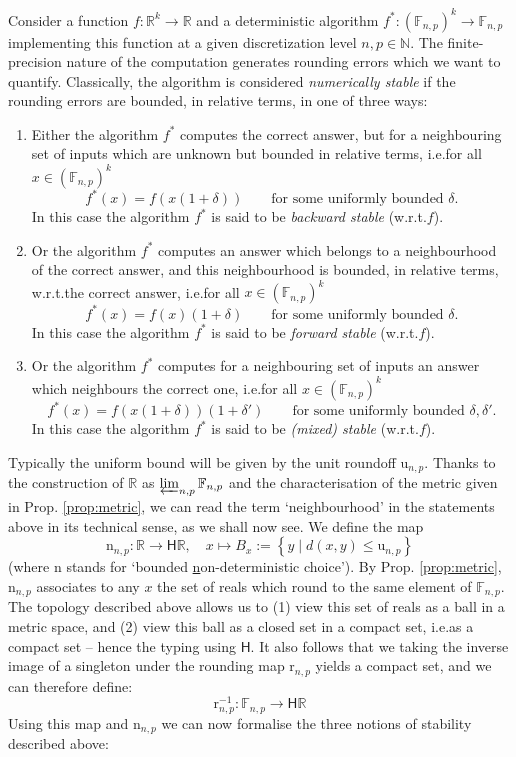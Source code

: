\documentclass[10pt,a4paper]{article}
\theoremstyle{plain}
\theoremstyle{definition}
\newcommand{\F}[1][n,p]{\mathbb{F}_{#1}}
\newcommand{\N}{\mathbb{N}}
\newcommand{\R}{\mathbb{R}}
\newcommand{\Round}[1][n,p]{\mathrm{r}_{#1}}
\newcommand{\Haus}{\mathsf{H}}
\newcommand{\uro}[1][n,p]{\mathrm{u}_{#1}}
\newcommand{\inv}{^{-1}}
\newcommand{\nd}[1][n,p]{\mathrm{n}_{#1}}
\begin{document}
Consider a function $f:\R^k\to\R$ and a deterministic algorithm $f^\ast:(\F)^k\to\F$ implementing this function at a given discretization level $n,p\in\N$. The finite-precision nature of the computation generates rounding errors which we want to quantify. Classically, the algorithm is considered \emph{numerically stable} if the rounding errors are bounded, in relative terms, in one of three ways:
\begin{enumerate}
\item Either the algorithm $f^\ast$ computes the correct answer, but for a neighbouring set of inputs which are unknown but bounded in relative terms, i.e.\@ for all $x\in (\F)^k$
\[
f^\ast(x)=f(x(1+\delta)) \qquad\text{for some uniformly bounded }\delta.
\]
In this case the algorithm $f^\ast$ is said to be \emph{backward stable} (w.r.t.\@ $f$).
\item Or the algorithm $f^\ast$ computes an answer which belongs to a neighbourhood of the correct answer, and this neighbourhood is bounded, in relative terms, w.r.t.\@ the correct answer, i.e.\@ for all $x\in (\F)^k$
\[
f^\ast(x)=f(x)(1+\delta) \qquad\text{for some uniformly bounded }\delta.
\]
In this case the algorithm $f^\ast$ is said to be \emph{forward stable} (w.r.t.\@ $f$).
\item Or the algorithm $f^\ast$ computes for a neighbouring set of inputs an answer which  neighbours the correct one, i.e.\@ for all $x\in (\F)^k$
\[
f^\ast(x)=f(x(1+\delta))(1+\delta') \qquad\text{for some uniformly bounded }\delta,\delta'.
\]
In this case the algorithm $f^\ast$ is said to be \emph{(mixed) stable} (w.r.t.\@ $f$).
\end{enumerate}
Typically the uniform bound will be given by the unit roundoff $\uro$. Thanks to the construction of $\R$ as $\varprojlim_{n,p}\F$ and the characterisation of the metric given in Prop. \ref{prop:metric}, we can read the term `neighbourhood' in the statements above in its technical sense, as we shall now see. We define the map
\begin{equation}\label{eq:nd}
\nd: \R\to\Haus \R, \quad x\mapsto B_x:=\left\{y\mid d(x,y)\leq \uro\right\}
\end{equation}
(where $\mathrm{n}$ stands for `bounded \underline{n}on-deterministic choice'). By Prop. \ref{prop:metric}, $\nd$ associates to any $x$ the set of reals which round to the same element of $\F$. The topology described above allows us to (1) view this set of reals as a ball in a metric space, and (2) view this ball as a closed set in a compact set, i.e.\@ as a compact set -- hence the typing using $\Haus$. It also follows that we taking the inverse image of a singleton under the rounding map $\Round$ yields a compact set, and we can therefore define:
\[
\Round\inv: \F\to\Haus \R
\]
Using this map and $\nd$ we can now formalise the three notions of stability described above:
\end{document}
